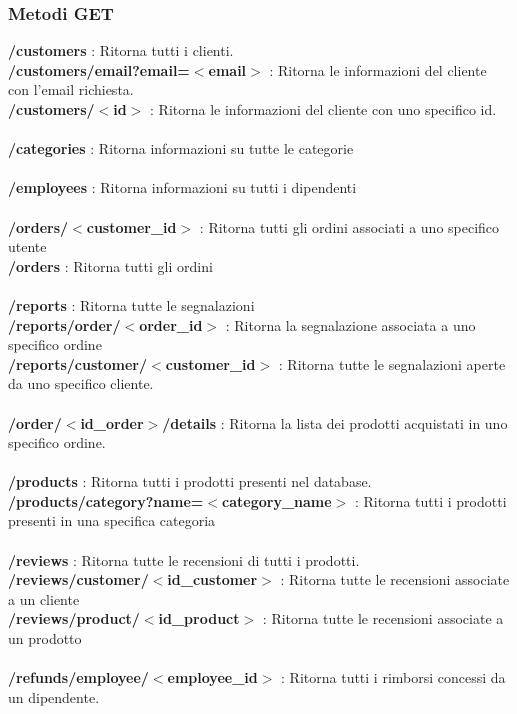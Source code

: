 \subsubsection{Metodi GET}
\textbf{/customers} : Ritorna tutti i clienti.\\
\textbf{/customers/email?email=$<$email$>$} : Ritorna le informazioni del cliente con l'email richiesta.\\
\textbf{/customers/$<$id$>$} : Ritorna le informazioni del cliente con uno specifico id.\\\\
\textbf{/categories} : Ritorna informazioni su tutte le categorie\\\\
\textbf{/employees} : Ritorna informazioni su tutti i dipendenti\\\\
\textbf{/orders/$<$customer\_id$>$ }: Ritorna tutti gli ordini associati a uno specifico utente\\
\textbf{/orders} : Ritorna tutti gli ordini\\\\
\textbf{/reports} : Ritorna tutte le segnalazioni\\
\textbf{/reports/order/$<$order\_id$>$} : Ritorna la segnalazione associata a uno specifico ordine\\
\textbf{/reports/customer/$<$customer\_id$>$} : Ritorna tutte le segnalazioni aperte da uno specifico cliente.\\\\
\textbf{/order/$<$id\_order$>$/details} : Ritorna la lista dei prodotti acquistati in uno specifico ordine.\\\\
\textbf{/products} : Ritorna tutti i prodotti presenti nel database. \\
\textbf{/products/category?name=$<$category\_name$>$} : Ritorna tutti i prodotti presenti in una specifica categoria \\\\
\textbf{/reviews} : Ritorna tutte le recensioni di tutti i prodotti. \\
\textbf{/reviews/customer/$<$id\_customer$>$} : Ritorna tutte le recensioni associate a un cliente\\
\textbf{/reviews/product/$<$id\_product$>$ }: Ritorna tutte le recensioni associate a un prodotto\\\\
\textbf{/refunds/employee/$<$employee\_id$>$ }: Ritorna tutti i rimborsi concessi da un dipendente.\\
